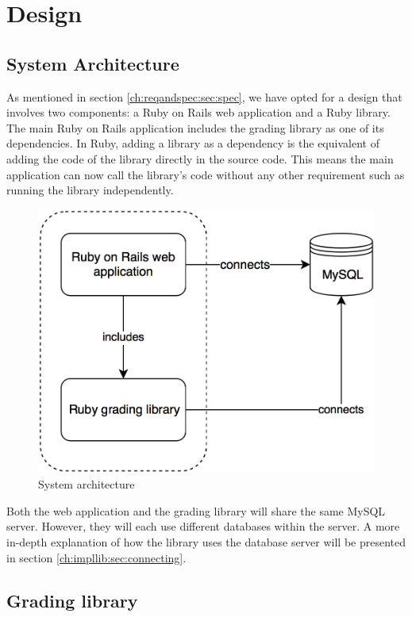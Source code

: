\chapter{Design}

\section{System Architecture}

As mentioned in section \ref{ch:reqandspec:sec:spec}, we have opted for a design that involves two components: a Ruby on Rails web application and a Ruby library. The main Ruby on Rails application includes the grading library as one of its dependencies. In Ruby, adding a library as a dependency is the equivalent of adding the code of the library directly in the source code. This means the main application can now call the library's code without any other requirement such as running the library independently.

\begin{figure}[H]
    \centering
    \includegraphics[width=(\linewidth / 2)]{Chapters/4-Design/sysarh.png}
    \caption{System architecture}
\end{figure}

Both the web application and the grading library will share the same MySQL server. However, they will each use different databases within the server. A more in-depth explanation of how the library uses the database server will be presented in section \ref{ch:impllib:sec:connecting}.

\section{Grading library}

